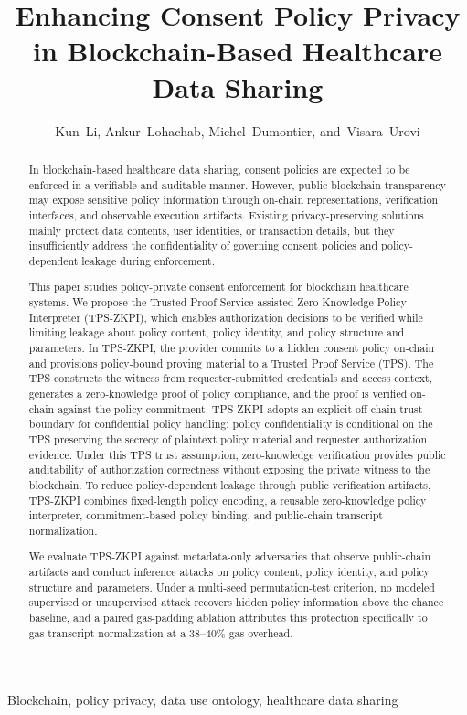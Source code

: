 \title{Enhancing Consent Policy Privacy in Blockchain-Based Healthcare Data Sharing}

\author{Kun~Li, Ankur~Lohachab, Michel~Dumontier, and~Visara~Urovi}

\maketitle

\begin{abstract}
	In blockchain-based healthcare data sharing, consent policies are expected to be enforced in a verifiable and auditable manner.
	However, public blockchain transparency may expose sensitive policy information through on-chain representations, verification interfaces, and observable execution artifacts.
	Existing privacy-preserving solutions mainly protect data contents, user identities, or transaction details, but they insufficiently address the confidentiality of governing consent policies and policy-dependent leakage during enforcement.

	This paper studies policy-private consent enforcement for blockchain healthcare systems.
	We propose the Trusted Proof Service-assisted Zero-Knowledge Policy Interpreter (TPS-ZKPI), which enables authorization decisions to be verified while limiting leakage about policy content, policy identity, and policy structure and parameters.
	In TPS-ZKPI, the provider commits to a hidden consent policy on-chain and provisions policy-bound proving material to a Trusted Proof Service (TPS).
	The TPS constructs the witness from requester-submitted credentials and access context, generates a zero-knowledge proof of policy compliance, and the proof is verified on-chain against the policy commitment.
	TPS-ZKPI adopts an explicit off-chain trust boundary for confidential policy handling: policy confidentiality is conditional on the TPS preserving the secrecy of plaintext policy material and requester authorization evidence.
	Under this TPS trust assumption, zero-knowledge verification provides public auditability of authorization correctness without exposing the private witness to the blockchain.
	To reduce policy-dependent leakage through public verification artifacts, TPS-ZKPI combines fixed-length policy encoding, a reusable zero-knowledge policy interpreter, commitment-based policy binding, and public-chain transcript normalization.

	We evaluate TPS-ZKPI against metadata-only adversaries that observe public-chain artifacts and conduct inference attacks on policy content, policy identity, and policy structure and parameters.
	Under a multi-seed permutation-test criterion, no modeled supervised or unsupervised attack recovers hidden policy information above the chance baseline, and a paired gas-padding ablation attributes this protection specifically to gas-transcript normalization at a $38$--$40\%$ gas overhead.
\end{abstract}

\begin{IEEEkeywords}
	Blockchain, policy privacy, data use ontology, healthcare data sharing
\end{IEEEkeywords}

\IEEEpeerreviewmaketitle
